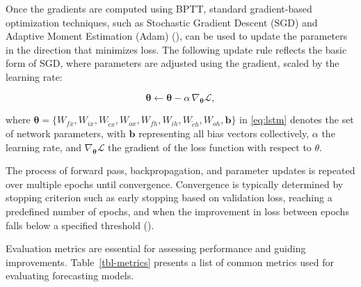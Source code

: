 \documentclass[
  letterpaper,
  double,
  12pt,
  1.0in]{beavtex}
\begin{document}
Once the gradients are computed using BPTT, standard gradient-based
optimization techniques, such as Stochastic Gradient Descent (SGD) and
Adaptive Moment Estimation (Adam) (), can be used to update the parameters in the direction
that minimizes loss. The following update rule reflects the basic form
of SGD, where parameters are adjusted using the gradient, scaled by the
learning rate:

\begin{equation}
\boldsymbol{\theta} \leftarrow \boldsymbol{\theta} - \alpha \, \nabla_{\boldsymbol{\theta}} \mathcal{L}, 
\end{equation}

where
\(\boldsymbol{\theta} = \{W_{fx}, W_{ix}, W_{\tilde{c}x}, W_{ox}, W_{fh}, W_{ih}, W_{\tilde{c}h}, W_{oh}, \boldsymbol{b}\}\)
in \eqref{eq:lstm} denotes the set of network parameters, with
\(\boldsymbol{b}\) representing all bias vectors collectively,
\(\alpha\) the learning rate, and
\(\nabla_{\boldsymbol{\theta}} \mathcal{L}\) the gradient of the loss
function with respect to \(\theta\).

The process of forward pass, backpropagation, and parameter updates is
repeated over multiple epochs until convergence. Convergence is
typically determined by stopping criterion such as early stopping based
on validation loss, reaching a predefined number of epochs, and when the
improvement in loss between epochs falls below a specified threshold
().

Evaluation metrics are essential for assessing performance and guiding
improvements. Table~\ref{tbl-metrics} presents a list of common metrics
used for evaluating forecasting models.

\begin{table}

\caption{\label{tbl-metrics}Common metrics for evaluating forecasting models.}


\end{table}%
\end{document}
